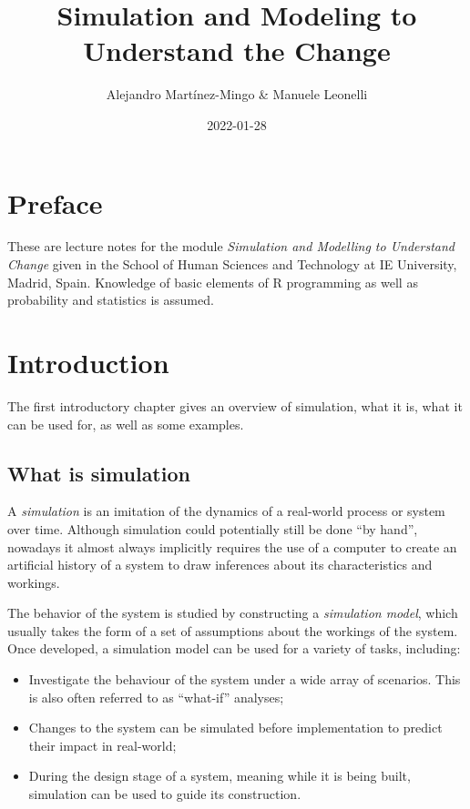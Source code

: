 \documentclass[
]{book}
\title{Simulation and Modeling to Understand the Change}
\author{Alejandro Martínez-Mingo \& Manuele Leonelli}
\date{2022-01-28}
\theoremstyle{definition}
\theoremstyle{definition}
\theoremstyle{definition}
\theoremstyle{definition}
\theoremstyle{remark}
\begin{document}
\maketitle

{
\setcounter{tocdepth}{1}
\tableofcontents
}
\hypertarget{preface}{%
\chapter*{Preface}\label{preface}}

These are lecture notes for the module \emph{Simulation and Modelling to Understand Change} given in the School of Human Sciences and Technology at IE University, Madrid, Spain. Knowledge of basic elements of R programming as well as probability and statistics is assumed.

\hypertarget{intro}{%
\chapter{Introduction}\label{intro}}

The first introductory chapter gives an overview of simulation, what it is, what it can be used for, as well as some examples.

\hypertarget{what-is-simulation}{%
\section{What is simulation}\label{what-is-simulation}}

A \emph{simulation} is an imitation of the dynamics of a real-world process or system over time. Although simulation could potentially still be done ``by hand'', nowadays it almost always implicitly requires the use of a computer to create an artificial history of a system to draw inferences about its characteristics and workings.

The behavior of the system is studied by constructing a \emph{simulation model}, which usually takes the form of a set of assumptions about the workings of the system. Once developed, a simulation model can be used for a variety of tasks, including:

\begin{itemize}
\item
  Investigate the behaviour of the system under a wide array of scenarios. This is also often referred to as ``what-if'' analyses;
\item
  Changes to the system can be simulated before implementation to predict their impact in real-world;
\item
  During the design stage of a system, meaning while it is being built, simulation can be used to guide its construction.
\end{itemize}
\end{document}
